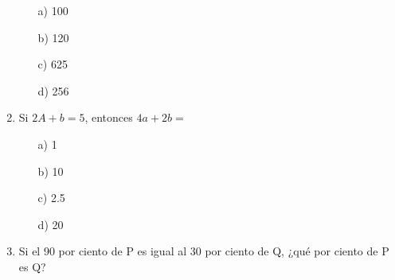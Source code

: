 \documentclass[10.5pt,letterpaper]{article}
\begin{document}
\begin{multicols}{2}
\begin{enumerate}
\begin{minipage}{0.24\linewidth}
\begin{enumerate}
\item[a)] 100
\end{enumerate}
\end{minipage}
\begin{minipage}{0.24\linewidth}
\begin{enumerate}
\item[b)] 120
\end{enumerate}
\end{minipage}
\begin{minipage}{0.24\linewidth}
\begin{enumerate}
\item[c)] 625
\end{enumerate}
\end{minipage}
\begin{minipage}{0.24\linewidth}
\begin{enumerate}
\item[d)] 256
\end{enumerate}
\end{minipage}
\item Si $2A+b=5$, entonces $4a+2b=$\\

\begin{minipage}{0.24\linewidth}
\begin{enumerate}
\item[a)] 1
\end{enumerate}
\end{minipage}
\begin{minipage}{0.24\linewidth}
\begin{enumerate}
\item[b)] 10
\end{enumerate}
\end{minipage}
\begin{minipage}{0.24\linewidth}
\begin{enumerate}
\item[c)] 2.5
\end{enumerate}
\end{minipage}
\begin{minipage}{0.24\linewidth}
\begin{enumerate}
\item[d)] 20
\end{enumerate}
\end{minipage}
\item Si el 90 por ciento de P es igual al 30 por ciento de Q, ¿qué por ciento de P es Q?\\


\end{enumerate}
\end{multicols}
\end{document}
